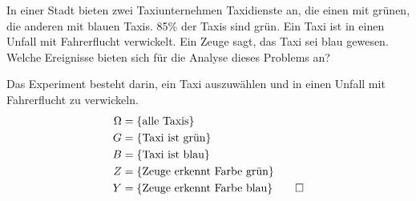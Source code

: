In einer Stadt bieten zwei Taxiunternehmen Taxidienste an, die einen mit
grünen, die anderen mit blauen Taxis. 85\% der Taxis sind grün.
Ein Taxi ist in einen Unfall mit Fahrerflucht verwickelt.
Ein Zeuge sagt, das Taxi sei blau gewesen.
Welche Ereignisse bieten sich für die Analyse dieses Problems an?


\begin{loesung}
Das Experiment besteht darin, ein Taxi auszuwählen und in einen Unfall
mit Fahrerflucht zu verwickeln.
\begin{align*}
\Omega&=\{\text{alle Taxis}\}\\
G&=\{\text{Taxi ist grün}\}\\
B&=\{\text{Taxi ist blau}\}\\
Z&=\{\text{Zeuge erkennt Farbe grün}\}\\
Y&=\{\text{Zeuge erkennt Farbe blau}\}
\qedhere
\end{align*}
\end{loesung}
